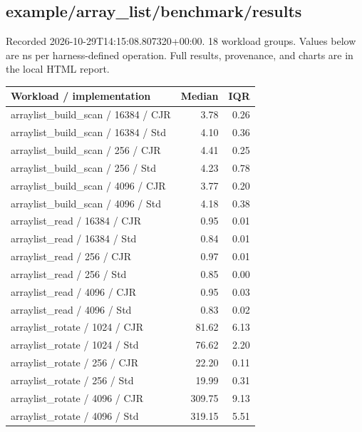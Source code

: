 \subsection{example/array\_list/benchmark/results}
Recorded 2026-10-29T14:15:08.807320+00:00. 18 workload groups. Values below are ns per harness-defined operation. Full results, provenance, and charts are in the local HTML report.
\begin{longtable}{p{}rr}Workload / implementation & Median & IQR \\ \hline
arraylist\_build\_scan / 16384 / CJR & 3.78 & 0.26 \\
arraylist\_build\_scan / 16384 / Std & 4.10 & 0.36 \\
arraylist\_build\_scan / 256 / CJR & 4.41 & 0.25 \\
arraylist\_build\_scan / 256 / Std & 4.23 & 0.78 \\
arraylist\_build\_scan / 4096 / CJR & 3.77 & 0.20 \\
arraylist\_build\_scan / 4096 / Std & 4.18 & 0.38 \\
arraylist\_read / 16384 / CJR & 0.95 & 0.01 \\
arraylist\_read / 16384 / Std & 0.84 & 0.01 \\
arraylist\_read / 256 / CJR & 0.97 & 0.01 \\
arraylist\_read / 256 / Std & 0.85 & 0.00 \\
arraylist\_read / 4096 / CJR & 0.95 & 0.03 \\
arraylist\_read / 4096 / Std & 0.83 & 0.02 \\
arraylist\_rotate / 1024 / CJR & 81.62 & 6.13 \\
arraylist\_rotate / 1024 / Std & 76.62 & 2.20 \\
arraylist\_rotate / 256 / CJR & 22.20 & 0.11 \\
arraylist\_rotate / 256 / Std & 19.99 & 0.31 \\
arraylist\_rotate / 4096 / CJR & 309.75 & 9.13 \\
arraylist\_rotate / 4096 / Std & 319.15 & 5.51 \\
\end{longtable}
